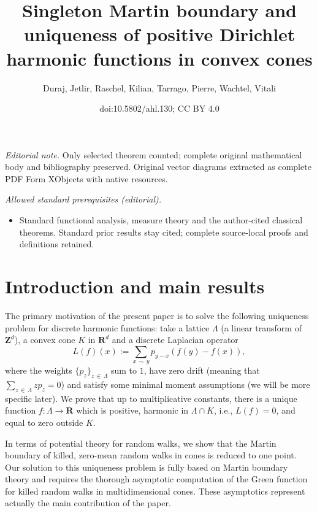 \documentclass[10pt]{amsart}
\title{Singleton Martin boundary and uniqueness of positive Dirichlet harmonic functions in convex cones}
\author{Duraj, Jetlir, Raschel, Kilian, Tarrago, Pierre, Wachtel, Vitali}
\date{doi:10.5802/ahl.130; CC BY 4.0}
\theoremstyle{definition}\newtheorem{defi}[theo]{Definition}\newtheorem{rema}[theo]{Remark}\newtheorem{exam}[theo]{Example}\newtheorem{exem}[theo]{Example}\newtheorem{nota}[theo]{Notation}
\newcommand{\bfR}{\mathbf{R}}
\newcommand{\bfZ}{\mathbf{Z}}
\begin{document}
\maketitle
\noindent\textit{Editorial note.} Only selected theorem counted; complete original mathematical body and bibliography preserved. Original vector diagrams extracted as complete PDF Form XObjects with native resources.\par\medskip
\noindent\textit{Allowed standard prerequisites (editorial).}\begin{itemize}
\item Standard functional analysis, measure theory and the author-cited classical theorems. Standard prior results stay cited; complete source-local proofs and definitions retained.
\end{itemize}\medskip


\section{Introduction and main results}\label{sec:intro}

The primary motivation of the present paper is to solve the following uniqueness problem for discrete harmonic functions: take a lattice $\Lambda$ (a linear transform of $\bfZ^d$), a convex cone $K$ in $\bfR^d$ and a discrete Laplacian operator
\[
L(f)(x):=\sum_{x\,\sim\,y} p_{y-x} \left(f(y)-f(x)\right),
\]
where the weights $\{p_{z}\}_{z\,\in\,\Lambda}$ sum to $1$, have zero drift (meaning that $\sum_{z\,\in\,\Lambda}zp_{z}=0$) and satisfy some minimal moment assumptions (we will be more specific later). We prove that up to multiplicative constants, there is a unique function $f:\Lambda \to \bfR$ which is positive, harmonic in $\Lambda\cap K$, i.e., $L(f)=0$, and equal to zero outside $K$.
\label{page:problem}

In terms of potential theory for random walks, we show that the Martin boundary of killed, zero-mean random walks in cones is reduced to one point. Our solution to this uniqueness problem is fully based on Martin boundary theory and requires the thorough asymptotic computation of the Green function for killed random walks in multidimensional cones. These asymptotics represent actually the main contribution of the paper.
\end{document}
